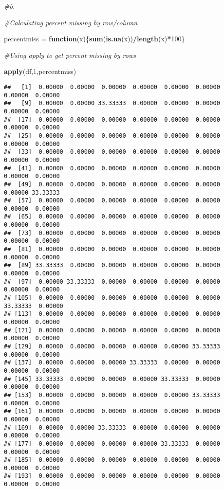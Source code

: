 \documentclass[
]{article}
\newenvironment{Shaded}{\begin{snugshade}}{\end{snugshade}}
\newcommand{\CommentTok}[1]{\textcolor[rgb]{0.56,0.35,0.01}{\textit{#1}}}
\newcommand{\ControlFlowTok}[1]{\textcolor[rgb]{0.13,0.29,0.53}{\textbf{#1}}}
\newcommand{\DecValTok}[1]{\textcolor[rgb]{0.00,0.00,0.81}{#1}}
\newcommand{\KeywordTok}[1]{\textcolor[rgb]{0.13,0.29,0.53}{\textbf{#1}}}
\newcommand{\NormalTok}[1]{#1}
\newcommand{\OperatorTok}[1]{\textcolor[rgb]{0.81,0.36,0.00}{\textbf{#1}}}
\newcommand{\StringTok}[1]{\textcolor[rgb]{0.31,0.60,0.02}{#1}}
\begin{document}
\begin{Shaded}
\begin{Highlighting}[]
\CommentTok{#b.}


\CommentTok{#Calculating percent missing by row/column}

\NormalTok{percentmiss =}\StringTok{ }\ControlFlowTok{function}\NormalTok{(x)\{}\KeywordTok{sum}\NormalTok{(}\KeywordTok{is.na}\NormalTok{(x))}\OperatorTok{/}\KeywordTok{length}\NormalTok{(x)}\OperatorTok{*}\DecValTok{100}\NormalTok{\}}

\CommentTok{#Using apply to get percent missing by rows}

\KeywordTok{apply}\NormalTok{(df,}\DecValTok{1}\NormalTok{,percentmiss)}
\end{Highlighting}
\end{Shaded}

\begin{verbatim}
##   [1]  0.00000  0.00000  0.00000  0.00000  0.00000  0.00000  0.00000  0.00000
##   [9]  0.00000  0.00000 33.33333  0.00000  0.00000  0.00000  0.00000  0.00000
##  [17]  0.00000  0.00000  0.00000  0.00000  0.00000  0.00000  0.00000  0.00000
##  [25]  0.00000  0.00000  0.00000  0.00000  0.00000  0.00000  0.00000  0.00000
##  [33]  0.00000  0.00000  0.00000  0.00000  0.00000  0.00000  0.00000  0.00000
##  [41]  0.00000  0.00000  0.00000  0.00000  0.00000  0.00000  0.00000  0.00000
##  [49]  0.00000  0.00000  0.00000  0.00000  0.00000  0.00000  0.00000 33.33333
##  [57]  0.00000  0.00000  0.00000  0.00000  0.00000  0.00000  0.00000  0.00000
##  [65]  0.00000  0.00000  0.00000  0.00000  0.00000  0.00000  0.00000  0.00000
##  [73]  0.00000  0.00000  0.00000  0.00000  0.00000  0.00000  0.00000  0.00000
##  [81]  0.00000  0.00000  0.00000  0.00000  0.00000  0.00000  0.00000  0.00000
##  [89] 33.33333  0.00000  0.00000  0.00000  0.00000  0.00000  0.00000  0.00000
##  [97]  0.00000 33.33333  0.00000  0.00000  0.00000  0.00000  0.00000  0.00000
## [105]  0.00000  0.00000  0.00000  0.00000  0.00000  0.00000 33.33333  0.00000
## [113]  0.00000  0.00000  0.00000  0.00000  0.00000  0.00000  0.00000  0.00000
## [121]  0.00000  0.00000  0.00000  0.00000  0.00000  0.00000  0.00000  0.00000
## [129]  0.00000  0.00000  0.00000  0.00000  0.00000 33.33333  0.00000  0.00000
## [137]  0.00000  0.00000  0.00000 33.33333  0.00000  0.00000  0.00000  0.00000
## [145] 33.33333  0.00000  0.00000  0.00000 33.33333  0.00000  0.00000  0.00000
## [153]  0.00000  0.00000  0.00000  0.00000  0.00000 33.33333  0.00000  0.00000
## [161]  0.00000  0.00000  0.00000  0.00000  0.00000  0.00000  0.00000  0.00000
## [169]  0.00000  0.00000 33.33333  0.00000  0.00000  0.00000  0.00000  0.00000
## [177]  0.00000  0.00000  0.00000  0.00000 33.33333  0.00000  0.00000  0.00000
## [185]  0.00000  0.00000  0.00000  0.00000  0.00000  0.00000  0.00000  0.00000
## [193]  0.00000  0.00000  0.00000  0.00000  0.00000  0.00000  0.00000  0.00000
\end{verbatim}
\end{document}
